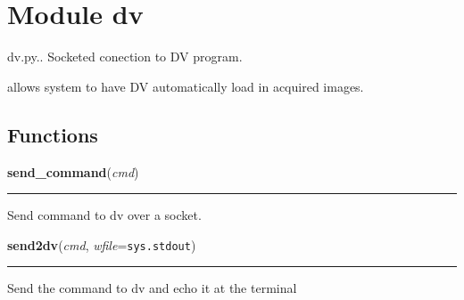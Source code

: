 %
%
%


\section{Module dv}

    \label{dv}
dv.py.. Socketed conection to DV program.

allows system to have DV automatically load in acquired images.



  \subsection{Functions}

    \label{dv:send_command}

    \vspace{0.5ex}

    \begin{boxedminipage}{\textwidth}

    \raggedright \textbf{send\_command}(\textit{cmd})

    \vspace{-1.5ex}

    \rule{\textwidth}{0.5\fboxrule}
    Send command to dv over a socket.

    \vspace{1ex}

    \end{boxedminipage}

    \label{dv:send2dv}

    \vspace{0.5ex}

    \begin{boxedminipage}{\textwidth}

    \raggedright \textbf{send2dv}(\textit{cmd}, \textit{wfile}=\texttt{sys.stdout})

    \vspace{-1.5ex}

    \rule{\textwidth}{0.5\fboxrule}
    Send the command to dv and echo it at the terminal

    \vspace{1ex}

    \end{boxedminipage}

